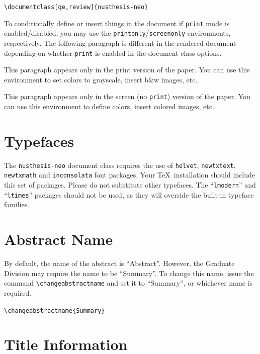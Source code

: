 \texttt{\textbackslash documentclass[qe,review]\{nusthesis-neo\}}

To conditionally define or insert things in the document if \texttt{print}
mode is enabled/disabled, you may use the \texttt{printonly}/\texttt{screenonly} 
environments, respectively. The following paragraph is
different in the rendered document depending on whether \texttt{print}
is enabled in the document class options.

\begin{printonly}
This paragraph appears only in the print version of the paper.
You can use this environment to set colors to grayscale, insert
b\&w images, etc.
\end{printonly}

\begin{screenonly}
This paragraph appears only in the screen (no \texttt{print}) version of the paper.
You can use this environment to define colors, insert colored
images, etc.
\end{screenonly}

\section{Typefaces}\label{sec:typefaces}

The \texttt{nusthesis-neo} document class requires the use of \texttt{helvet},
\texttt{newtxtext}, \texttt{newtxmath} and \texttt{inconsolata} font
packages.
Your \TeX\ installation should include
this set of packages. Please do not substitute other typefaces. The
``\verb|lmodern|'' and ``\verb|ltimes|'' packages should not be used,
as they will override the built-in typeface families.

\section{Abstract Name}\label{sec:abstract-name}
By default, the name of the abstract is ``Abstract''. However, the
Graduate Division may require the name to be ``Summary''. To change
this name, issue the command \texttt{\textbackslash changeabstractname}
and set it to ``Summary'', or whichever name is required.

\texttt{\textbackslash changeabstractname\{Summary\}}

\section{Title Information}\label{sec:title}

